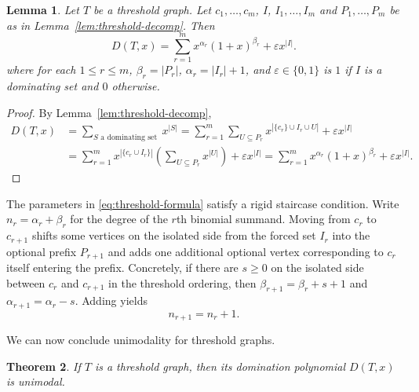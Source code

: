 \documentclass[11pt]{amsart}
\newtheorem{theorem}{Theorem}
\newtheorem{lemma}[theorem]{Lemma}
\numberwithin{equation}{section}
\begin{document}
\begin{lemma}\label{lem:closedform}
Let $T$ be a threshold graph. Let $c_1,\ldots,c_m$, $I$, $I_1,\ldots,I_m$ and $P_1,\ldots,P_m$ be as in Lemma~\ref{lem:threshold-decomp}. Then
\begin{equation}\label{eq:threshold-formula}
D(T,x)=\sum_{r=1}^m x^{\alpha_r}(1+x)^{\beta_r}+\varepsilon x^{|I|}.
\end{equation}
where for each $1 \leq r \leq m$, $\beta_r=|P_r|$, $\alpha_r=|I_r|+1$, and $\varepsilon \in \{0,1\}$ is $1$ if $I$ is a dominating set and $0$ otherwise.
\end{lemma}
\begin{proof}
By Lemma~\ref{lem:threshold-decomp}, 
\begin{align*}
D(T,x) &=\sum_{S \text{ a dominating set }} x^{|S|} = \sum_{r=1}^m \sum_{U \subseteq P_r} x^{|\{c_r\} \cup I_r \cup U|} + \varepsilon x^{|I|} \\
&=\sum_{r=1}^m x^{|\{c_r \cup I_r\}|} \left(\sum_{U \subseteq P_r} x^{|U|}\right) + \varepsilon x^{|I|} =\sum_{r=1}^m x^{\alpha_r}(1+x)^{\beta_r}+\varepsilon x^{|I|}.
\end{align*}
\end{proof}

The parameters in \eqref{eq:threshold-formula} satisfy a rigid staircase condition. Write $n_r=\alpha_r+\beta_r$ for the degree of the $r$th binomial summand. Moving from $c_r$ to $c_{r+1}$ shifts some vertices on the isolated side from the forced set $I_r$ into the optional prefix $P_{r+1}$ and adds one additional optional vertex corresponding to $c_r$ itself entering the prefix. Concretely, if there are $s\ge 0$ on the isolated side between $c_r$ and $c_{r+1}$ in the threshold ordering, then $\beta_{r+1}=\beta_r+s+1$ and $\alpha_{r+1}=\alpha_r-s$. Adding yields
\begin{equation}\label{eq:degree-step}
n_{r+1}=n_r+1.
\end{equation}


We can now conclude unimodality for threshold graphs.

\begin{theorem}\label{thm:thresholdUnimodal}
If $T$ is a threshold graph, then its domination polynomial $D(T,x)$ is unimodal.
\end{theorem}
\end{document}
